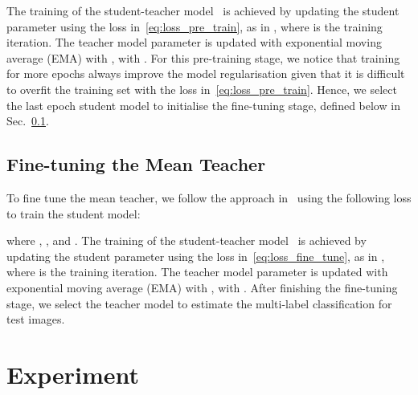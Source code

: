 \documentclass[runningheads]{llncs}
\begin{document}
The training of the student-teacher model~\cite{moco,zhou2020comparing,tarvainen2017mean} is achieved by updating the student parameter using the loss in~\eqref{eq:loss_pre_train}, as in
, where  is the training iteration.  The teacher model parameter is updated with exponential moving average (EMA) with , with .
For this pre-training stage, we notice that training for more epochs always improve the model regularisation given that it is difficult to overfit the training set with the loss in~\eqref{eq:loss_pre_train}. 
Hence, we select the last epoch student model  to initialise the fine-tuning stage, defined below in Sec.~\ref{sec:fine_tune}. 


\subsection{Fine-tuning the Mean Teacher}
\label{sec:fine_tune}

To fine tune the mean teacher, we follow the approach in~\cite{moco,tarvainen2017mean} using the following loss to train the student model:

where ,
, and 
.
The training of the student-teacher model~\cite{moco,tarvainen2017mean,zhou2020comparing} is achieved by updating the student parameter using the loss in~\eqref{eq:loss_fine_tune}, as in
, where  is the training iteration.  The teacher model parameter is updated with exponential moving average (EMA) with , with .
After finishing the fine-tuning stage, we select the teacher model  to estimate the multi-label classification for test images.


\vspace{-.1in}
\section{Experiment}
\vspace{-.1in}
\end{document}
